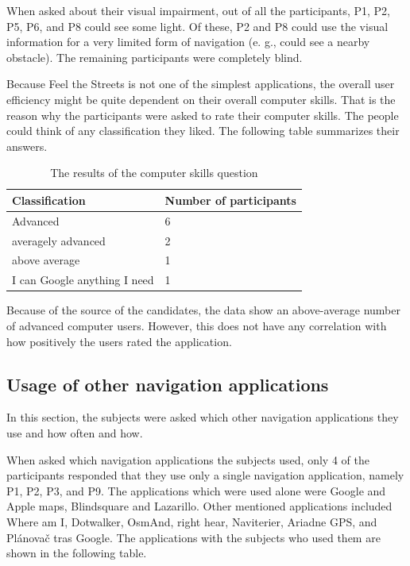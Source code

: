 \documentclass[nolof,digital]{fithesis3}
\begin{document}
When asked about their visual impairment, out of all the participants, P1, P2, P5, P6, and P8 could see some light. Of these, P2 and P8 could use the visual information for a very limited form of navigation (e. g., could see a nearby obstacle). The remaining participants were completely blind.

Because Feel the Streets is not one of the simplest applications, the overall user efficiency might be quite dependent on their overall computer skills. That is the reason why the participants were asked to rate their computer skills. The people could think of any classification they liked. The following table summarizes their answers.
\begin{table}
\caption{The results of the computer skills question}
\begin{tabularx}{\textwidth}{ |X|X| }
\vspace*{0.5 cm}
\hline
Classification & Number of participants \\
\hline
Advanced & 6 \\
averagely advanced & 2 \\
above average & 1 \\
I can Google anything I need & 1 \\
\hline
\end{tabularx}
\end{table}
Because of the source of the candidates, the data show an above-average number of advanced computer users. However, this does not have any correlation with how positively the users rated the application.
\subsection{Usage of other navigation applications}
In this section, the subjects were asked which other navigation applications they use and how often and how.

When asked which navigation applications the subjects used, only 4 of the participants responded that they use only a single navigation application, namely P1, P2, P3, and P9. The applications which were used alone were Google and Apple maps, Blindsquare and Lazarillo. Other mentioned applications included Where am I, Dotwalker, OsmAnd, right hear, Naviterier, Ariadne GPS, and Plánovač tras Google. The applications with the subjects who used them are shown in the following table.
\end{document}
